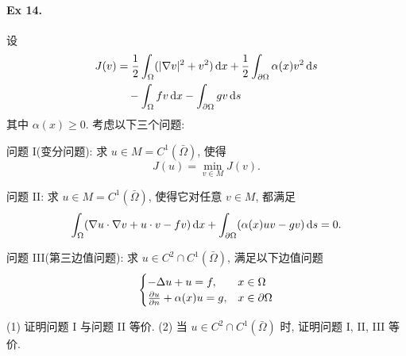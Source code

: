 \paragraph{Ex 14.}
设
\begin{align*}
J(v) &= \frac{1}{2} \int_{\Omega} (|\nabla v|^2 + v^2)\operatorname{d\!} x
+ \frac{1}{2} \int_{\partial \Omega} \alpha(x) v^2 \operatorname{d\!} s \\
&\quad- \int_{\Omega} fv \operatorname{d\!} x - \int_{\partial \Omega} gv \operatorname{d\!} s
\end{align*}
其中 $\alpha(x) \geq 0$. 考虑以下三个问题:

问题 I(变分问题): 求 $u \in M = C^1(\bar \Omega)$, 使得
\[ J(u)= \min_{v \in M} J(v). \]

问题 II: 求 $u \in M = C^1(\bar \Omega)$, 使得它对任意 $v \in M$, 都满足
\[
\int_{\Omega} (\nabla u \cdot \nabla v + u \cdot v - fv)\operatorname{d\!} x
+ \int_{\partial \Omega} (\alpha(x) uv-gv )\operatorname{d\!} s = 0.
\]

问题 III(第三边值问题): 求 $u \in C^2 \cap C^1(\bar \Omega)$, 满足以下边值问题
\[ \begin{cases}
- \Delta u + u = f, & x \in \Omega \\
{\frac{\partial {u}}{\partial {n}}} + \alpha (x) u = g, & x \in \partial \Omega
\end{cases} \]

(1) 证明问题 I 与问题 II 等价.
(2) 当 $u \in C^2 \cap C^1(\bar \Omega)$ 时, 证明问题 I, II, III 等价.

